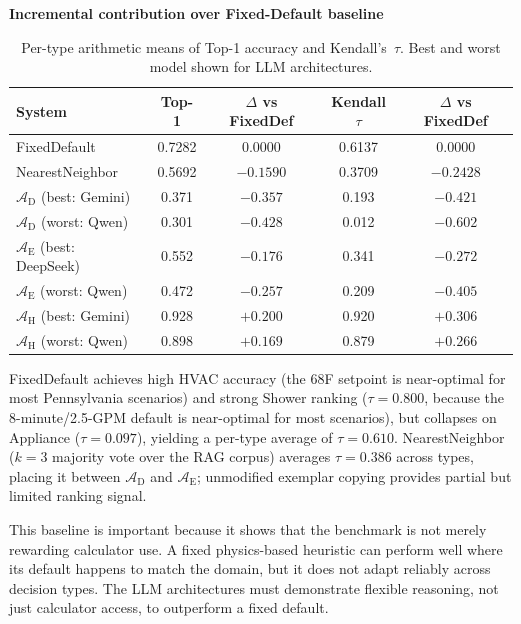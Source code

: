 \documentclass[a4paper,fleqn]{cas-dc}
\begin{document}
\begin{table}[htbp]
\begin{threeparttable}
  \footnotesize
  \centering
  \textbf{Incremental contribution over Fixed-Default baseline}
  \begin{tabular}{lcccc}
    \toprule
    System & Top-1 & $\Delta$ vs FixedDef & Kendall $\tau$ & $\Delta$ vs FixedDef \\
    \midrule
    FixedDefault & 0.7282 & $0.0000$ & 0.6137 & $0.0000$ \\
    NearestNeighbor & 0.5692 & $-0.1590$ & 0.3709 & $-0.2428$ \\
    \addlinespace
    $\mathcal{A}_{\text{D}}$ (best: Gemini) & 0.371 & $-0.357$ & 0.193 & $-0.421$ \\
    $\mathcal{A}_{\text{D}}$ (worst: Qwen)   & 0.301 & $-0.428$ & 0.012 & $-0.602$ \\
    \addlinespace
    $\mathcal{A}_{\text{E}}$ (best: DeepSeek) & 0.552 & $-0.176$ & 0.341 & $-0.272$ \\
    $\mathcal{A}_{\text{E}}$ (worst: Qwen)    & 0.472 & $-0.257$ & 0.209 & $-0.405$ \\
    \addlinespace
    $\mathcal{A}_{\text{H}}$ (best: Gemini) & 0.928 & $+0.200$ & 0.920 & $+0.306$ \\
    $\mathcal{A}_{\text{H}}$ (worst: Qwen)  & 0.898 & $+0.169$ & 0.879 & $+0.266$ \\
    \bottomrule
  \end{tabular}
\end{threeparttable}
\caption{Per-type arithmetic means of Top-1 accuracy and Kendall's~$\tau$. Best and worst model shown for LLM architectures.}
\label{tab:incremental-contribution}
\end{table}
\FloatBarrier

FixedDefault achieves high HVAC accuracy (the 68\textdegree{}F setpoint is near-optimal for most Pennsylvania scenarios) and strong Shower ranking ($\tau = 0.800$, because the 8-minute/2.5-GPM default is near-optimal for most scenarios), but collapses on Appliance ($\tau = 0.097$), yielding a per-type average of $\tau = 0.610$. NearestNeighbor ($k=3$ majority vote over the RAG corpus) averages $\tau = 0.386$ across types, placing it between $\mathcal{A}_{\text{D}}$ and $\mathcal{A}_{\text{E}}$; unmodified exemplar copying provides partial but limited ranking signal.

This baseline is important because it shows that the benchmark is not merely rewarding calculator use. A fixed physics-based heuristic can perform well where its default happens to match the domain, but it does not adapt reliably across decision types. The LLM architectures must demonstrate flexible reasoning, not just calculator access, to outperform a fixed default.
\end{document}

